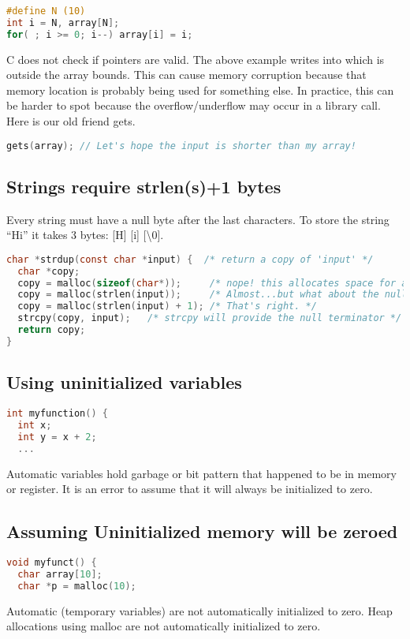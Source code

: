 \begin{lstlisting}[language=C]
#define N (10)
int i = N, array[N];
for( ; i >= 0; i--) array[i] = i;
\end{lstlisting}

C does not check if pointers are valid.
The above example writes into  which is outside the array bounds.
This can cause memory corruption because that memory location is probably being used for something else.
In practice, this can be harder to spot because the overflow/underflow may occur in a library call.
Here is our old friend gets.

\begin{lstlisting}[language=C]
gets(array); // Let's hope the input is shorter than my array!
\end{lstlisting}


\subsection{Strings require strlen(s)+1 bytes}

Every string must have a null byte after the last characters.
To store the string ``Hi'' it takes 3 bytes: [H] [i] [\backslash 0].

\begin{lstlisting}[language=C]
char *strdup(const char *input) {  /* return a copy of 'input' */
  char *copy;
  copy = malloc(sizeof(char*));     /* nope! this allocates space for a pointer, not a string */
  copy = malloc(strlen(input));     /* Almost...but what about the null terminator? */
  copy = malloc(strlen(input) + 1); /* That's right. */
  strcpy(copy, input);   /* strcpy will provide the null terminator */
  return copy;
}
\end{lstlisting}

\subsection{Using uninitialized variables}

\begin{lstlisting}[language=C]
int myfunction() {
  int x;
  int y = x + 2;
  ...
\end{lstlisting}

Automatic variables hold garbage or bit pattern that happened to be in memory or register.
It is an error to assume that it will always be initialized to zero.

\subsection{Assuming Uninitialized memory will be zeroed}

\begin{lstlisting}[language=C]
void myfunct() {
  char array[10];
  char *p = malloc(10);
\end{lstlisting}

Automatic (temporary variables) are not automatically initialized to zero.
Heap allocations using malloc are not automatically initialized to zero.
